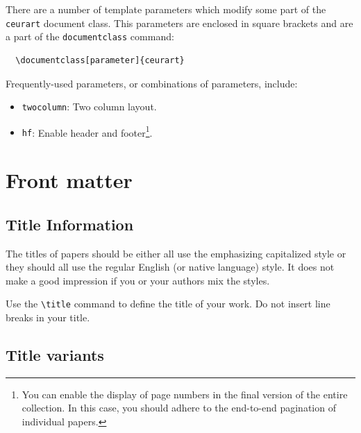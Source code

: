 \documentclass[
]{ceurart}
\begin{document}
There are a number of template
parameters which modify some part of the \verb|ceurart| document class.
This parameters are enclosed in square
brackets and are a part of the {\verb|documentclass|} command:
\begin{verbatim}
  \documentclass[parameter]{ceurart}
\end{verbatim}

Frequently-used parameters, or combinations of parameters, include:
\begin{itemize}
\item {\verb|twocolumn|}: Two column layout.
\item {\verb|hf|}: Enable header and footer\footnote{You can enable
    the display of page numbers in the final version of the entire
    collection. In this case, you should adhere to the end-to-end
    pagination of individual papers.}.
\end{itemize}

\section{Front matter}

\subsection{Title Information}

The titles of papers should be either all use the emphasizing
capitalized style or they should all use the regular English (or
native language) style. It does not make a good impression if you or
your authors mix the styles.

Use the \verb|\title| command to define the title of your work. Do not
insert line breaks in your title.

\subsection{Title variants}
\end{document}
